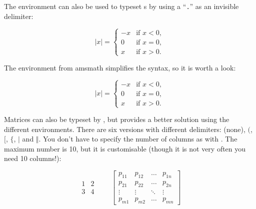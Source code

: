 The  environment can also be used to typeset s by
using a ``\verb|.|'' as an invisible  delimiter:
\begin{example}
\begin{equation*}
  |x| = \left\{
    \begin{array}{rl}
      -x & \text{if } x < 0,\\
      0 & \text{if } x = 0,\\
      x & \text{if } x > 0.
    \end{array} \right.
\end{equation*}
\end{example}
The  environment from \textsf{amsmath} simplifies
the syntax, so it is worth a look:
\begin{example}
  \begin{equation*}
    |x| = 
    \begin{cases}
      -x & \text{if } x < 0,\\
      0 & \text{if } x = 0,\\
      x & \text{if } x > 0.
    \end{cases} 
\end{equation*}
\end{example}


Matrices can also be typeset by , but
 provides a better solution using the different 
environments. There are six versions with different delimiters: 
(none),  $($,  $[$,  $\{$,  $\vert$ and
 $\Vert$. You don't have to specify the number of columns as with
. The maximum number is 10, but it is customisable (though it is not
very often you need 10 columns!):
\begin{example}
\begin{equation*}
  \begin{matrix} 
    1 & 2 \\
    3 & 4 
  \end{matrix} \qquad
  \begin{bmatrix} 
    p_{11} & p_{12} & \ldots 
    & p_{1n} \\
    p_{21} & p_{22} & \ldots 
    & p_{2n} \\
    \vdots & \vdots & \ddots 
    & \vdots \\
    p_{m1} & p_{m2} & \ldots 
    & p_{mn} 
  \end{bmatrix}
\end{equation*}
\end{example}



